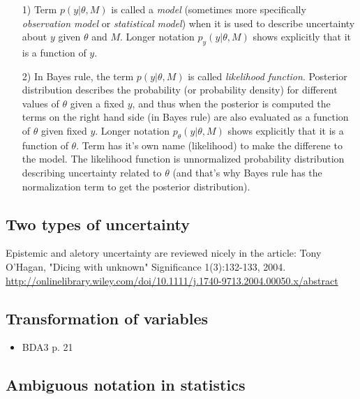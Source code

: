 \documentclass[a4paper,11pt,english]{article}
\begin{document}
\begin{itemize}
\item[1)] Term $p(y|\theta,M)$ is called a \emph{model} (sometimes
  more specifically \emph{observation model} or \emph{statistical
    model}) when it is used to describe uncertainty about $y$ given
  $\theta$ and $M$. Longer notation $p_y(y|\theta,M)$ shows explicitly
  that it is a function of $y$.

\item[2)] In Bayes rule, the term $p(y|\theta,M)$ is called
  \emph{likelihood function}. Posterior distribution describes the
  probability (or probability density) for different values of
  $\theta$ given a fixed $y$, and thus when the posterior is computed
  the terms on the right hand side (in Bayes rule) are also evaluated
  as a function of $\theta$ given fixed $y$. Longer notation
  $p_\theta(y|\theta,M)$ shows explicitly that it is a function of
  $\theta$. Term has it's own name (likelihood) to make the differene
  to the model. The likelihood function is unnormalized probability
  distribution describing uncertainty related to $\theta$ (and that's
  why Bayes rule has the normalization term to get the posterior
  distribution).
\end{itemize}

\subsection*{Two types of uncertainty}

Epistemic and aletory uncertainty are reviewed nicely in the article:
Tony O'Hagan, "Dicing with unknown"
Significance 1(3):132-133, 2004. \url{http://onlinelibrary.wiley.com/doi/10.1111/j.1740-9713.2004.00050.x/abstract}

\subsection*{Transformation of variables}

  \begin{itemize}
  \item BDA3 p. 21
  \end{itemize}

\subsection*{Ambiguous notation in statistics}
  
\end{document}
